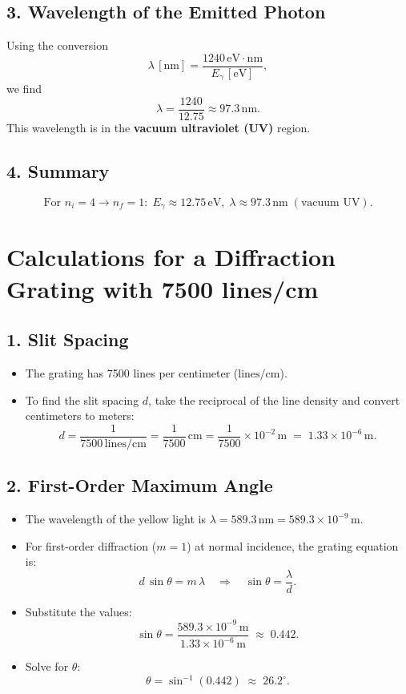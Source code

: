\documentclass[12pt]{article}
\theoremstyle{definition} %
\theoremstyle{plain} %
\begin{document}
\subsection*{3. Wavelength of the Emitted Photon}
Using the conversion 
\[
\lambda \,[\text{nm}] = \frac{1240\,\text{eV}\cdot\text{nm}}{E_{\gamma}\,[\text{eV}]},
\]
we find
\[
\lambda 
= \frac{1240}{12.75}
\approx 97.3\,\text{nm}.
\]
This wavelength is in the \textbf{vacuum ultraviolet (UV)} region.

\subsection*{4. Summary}
\[
\boxed{
\text{For } n_i=4 \to n_f=1:\;
E_{\gamma} \approx 12.75\,\text{eV},\;
\lambda \approx 97.3\,\text{nm}\; (\text{vacuum UV}).
}
\]

\section*{Calculations for a Diffraction Grating with 7500 lines/cm}

\subsection*{1. Slit Spacing}
\begin{itemize}
    \item The grating has 7500 lines per centimeter (\(\text{lines/cm}\)).
    \item To find the slit spacing \(d\), take the reciprocal of the line density 
    and convert centimeters to meters:
    \[
      d 
      = \frac{1}{7500\,\text{lines/cm}} 
      = \frac{1}{7500}\,\text{cm} 
      = \frac{1}{7500} \times 10^{-2}\,\text{m} 
      \;=\; 1.33 \times 10^{-6}\,\text{m}.
    \]
\end{itemize}

\subsection*{2. First-Order Maximum Angle}
\begin{itemize}
    \item The wavelength of the yellow light is \(\lambda = 589.3\,\text{nm} = 589.3 \times 10^{-9}\,\text{m}.\)
    \item For first-order diffraction (\(m=1\)) at normal incidence, the grating equation is:
    \[
      d \,\sin \theta = m \,\lambda 
      \quad\Longrightarrow\quad
      \sin \theta = \frac{\lambda}{d}.
    \]
    \item Substitute the values:
    \[
      \sin \theta 
      = \frac{589.3 \times 10^{-9}\,\text{m}}{1.33 \times 10^{-6}\,\text{m}}
      \;\approx\; 0.442.
    \]
    \item Solve for \(\theta\):
    \[
      \theta = \sin^{-1}(0.442) 
      \;\approx\; 26.2^\circ.
    \]
\end{itemize}
\end{document}

